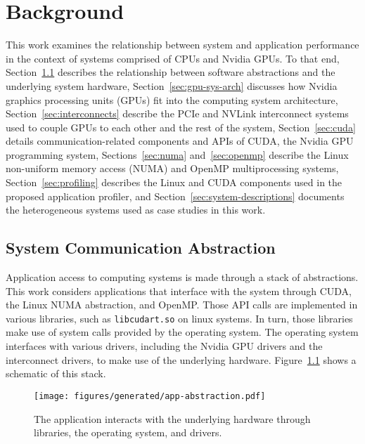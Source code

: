 \chapter{Background}
\label{ch:background}

This work examines the relationship between system and application performance in the context of systems comprised of CPUs and Nvidia GPUs.
To that end, 
Section~\ref{sec:sys-abstraction}            describes the relationship between software abstractions and the underlying system hardware,
Section~\ref{sec:gpu-sys-arch}               discusses how Nvidia graphics processing units (GPUs) fit into the computing system architecture,
Section~\ref{sec:interconnects}              describe the PCIe and NVLink interconnect systems used to couple GPUs to each other and the rest of the system,
Section~\ref{sec:cuda}                       details communication-related components and APIs of CUDA, the Nvidia GPU programming system,
Sections~\ref{sec:numa} and~\ref{sec:openmp} describe the Linux non-uniform memory access (NUMA) and OpenMP multiprocessing systems,
Section~\ref{sec:profiling}                  describes the Linux and CUDA components used in the proposed application profiler,
and Section~\ref{sec:system-descriptions}    documents the heterogeneous systems used as case studies in this work.


\section{System Communication Abstraction}
\label{sec:sys-abstraction}

Application access to computing systems is made through a stack of abstractions.
This work considers applications that interface with the system through CUDA, the Linux NUMA abstraction, and OpenMP.
Those API calls are implemented in various libraries, such as \texttt{libcudart.so} on linux systems.
In turn, those libraries make use of system calls provided by the operating system.
The operating system interfaces with various drivers, including the Nvidia GPU drivers and the interconnect drivers, to make use of the underlying hardware.
Figure~\ref{fig:app-abstraction} shows a schematic of this stack.

\begin{figure}[ht]
    \centering
    \texttt{[image: figures/generated/app-abstraction.pdf]}
    \caption[System Abstraction]{
		The application interacts with the underlying hardware through libraries, the operating system, and drivers.
	}
    \label{fig:app-abstraction}
\end{figure}

